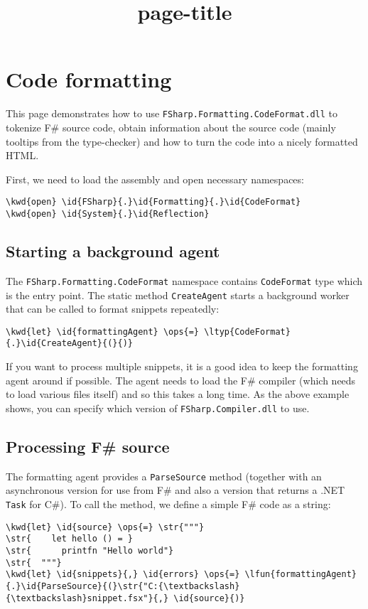 \documentclass{article}
\title{{page-title}}
\date{}
\newcommand{\id}[1]{\textcolor{black}{#1}}
\newcommand{\kwd}[1]{\textcolor{navy}{#1}}
\newcommand{\ops}[1]{\textcolor{purple}{#1}}
\newcommand{\str}[1]{\textcolor{olive}{#1}}
\begin{document}
\maketitle

\section*{Code formatting}



This page demonstrates how to use \texttt{FSharp.Formatting.CodeFormat.dll} to tokenize
F\# source code, obtain information about the source code (mainly tooltips
from the type-checker) and how to turn the code into a nicely formatted HTML.


First, we need to load the assembly and open necessary namespaces:
\begin{Verbatim}[commandchars=\\\{\}]
\kwd{open} \id{FSharp}{.}\id{Formatting}{.}\id{CodeFormat}
\kwd{open} \id{System}{.}\id{Reflection}
\end{Verbatim}

\subsection*{Starting a background agent}



The \texttt{FSharp.Formatting.CodeFormat} namespace contains \texttt{CodeFormat} type which is the
entry point. The static method \texttt{CreateAgent} starts a background worker that
can be called to format snippets repeatedly:
\begin{Verbatim}[commandchars=\\\{\}]
\kwd{let} \id{formattingAgent} \ops{=} \ltyp{CodeFormat}{.}\id{CreateAgent}{(}{)}
\end{Verbatim}



If you want to process multiple snippets, it is a good idea to keep the
formatting agent around if possible. The agent needs to load the F\# compiler
(which needs to load various files itself) and so this takes a long time. As the above
example shows, you can specify which version of \texttt{FSharp.Compiler.dll} to use.
\subsection*{Processing F\# source}



The formatting agent provides a \texttt{ParseSource} method (together with an asynchronous
version for use from F\# and also a version that returns a .NET \texttt{Task} for C\#).
To call the method, we define a simple F\# code as a string:
\begin{Verbatim}[commandchars=\\\{\}]
\kwd{let} \id{source} \ops{=} \str{"""}
\str{    let hello () = }
\str{      printfn "Hello world"}
\str{  """}
\kwd{let} \id{snippets}{,} \id{errors} \ops{=} \lfun{formattingAgent}{.}\id{ParseSource}{(}\str{"C:{\textbackslash}{\textbackslash}snippet.fsx"}{,} \id{source}{)}
\end{Verbatim}
\end{document}
